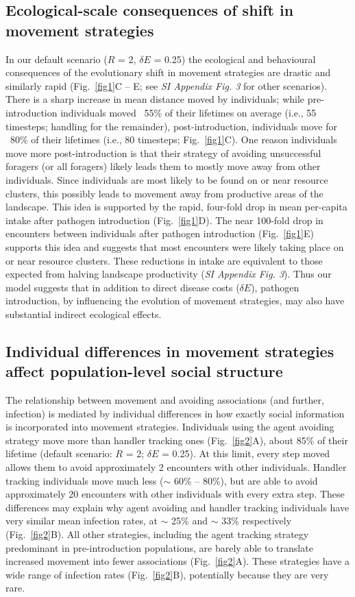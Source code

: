 \subsection*{Ecological-scale consequences of shift in movement strategies}

In our default scenario ($R$ = 2, $\delta E$ = 0.25) the ecological and behavioural consequences of the evolutionary shift in movement strategies are drastic and similarly rapid (Fig.~\ref{fig1}C -- E; see \textit{SI Appendix Fig. 3} for other scenarios).
There is a sharp increase in mean distance moved by individuals; while pre-introduction individuals moved ~55\% of their lifetimes on average (i.e., 55 timesteps; handling for the remainder), post-introduction, individuals move for ~80\% of their lifetimes (i.e., 80 timesteps; Fig.~\ref{fig1}C).
One reason individuals move more post-introduction is that their strategy of avoiding unsuccessful foragers (or all foragers) likely leads them to mostly move away from other individuals.
Since individuals are most likely to be found on or near resource clusters, this possibly leads to movement away from productive areas of the landscape.
This idea is supported by the rapid, four-fold drop in mean per-capita intake after pathogen introduction (Fig.~\ref{fig1}D).
The near 100-fold drop in encounters between individuals after pathogen introduction (Fig.~\ref{fig1}E) supports this idea and suggests that most encounters were likely taking place on or near resource clusters.
These reductions in intake are equivalent to those expected from halving landscape productivity (\textit{SI Appendix Fig. 3}).
Thus our model suggests that in addition to direct disease costs ($\delta E$), pathogen introduction, by influencing the evolution of movement strategies, may also have substantial indirect ecological effects.

\subsection*{Individual differences in movement strategies affect population-level social structure}

The relationship between movement and avoiding associations (and further, infection) is mediated by individual differences in how exactly social information is incorporated into movement strategies.
Individuals using the agent avoiding strategy move more than handler tracking ones (Fig.~\ref{fig2}A), about 85\% of their lifetime (default scenario: $R$ = 2; $\delta E$ = 0.25).
At this limit, every step moved allows them to avoid approximately 2 encounters with other individuals.
Handler tracking individuals move much less ($\sim$ 60\% -- 80\%), but are able to avoid approximately 20 encounters with other individuals with every extra step.
These differences may explain why agent avoiding and handler tracking individuals have very similar mean infection rates, at $\sim$ 25\% and $\sim$ 33\% respectively (Fig.~\ref{fig2}B).
All other strategies, including the agent tracking strategy predominant in pre-introduction populations, are barely able to translate increased movement into fewer associations (Fig.~\ref{fig2}A).
These strategies have a wide range of infection rates (Fig.~\ref{fig2}B), potentially because they are very rare.

